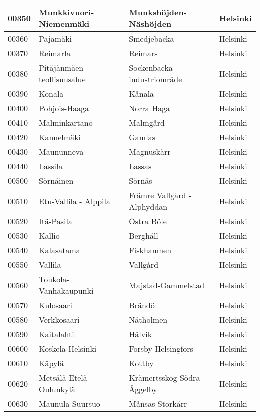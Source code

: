 \begin{longtable}{llll}
    00350 & Munkkivuori-Niemenmäki & Munkshöjden-Näshöjden & Helsinki\\ [0.25ex] \hline
    00360 & Pajamäki & Smedjebacka & Helsinki \\ [0.25ex] \hline
    00370 & Reimarla & Reimars & Helsinki \\ [0.25ex] \hline
    00380 & Pitäjänmäen teollisuusalue & Sockenbacka industriområde & Helsinki \\ [0.25ex] \hline
    00390 & Konala & Kånala & Helsinki \\ [0.25ex] \hline
    00400 & Pohjois-Haaga & Norra Haga & Helsinki \\ [0.25ex] \hline
    00410 & Malminkartano & Malmgård & Helsinki \\ [0.25ex] \hline
    00420 & Kannelmäki & Gamlas & Helsinki \\ [0.25ex] \hline
    00430 & Maununneva & Magnuskärr & Helsinki \\ [0.25ex] \hline
    00440 & Lassila & Lassas & Helsinki \\ [0.25ex] \hline
    00500 & Sörnäinen & Sörnäs & Helsinki \\ [0.25ex] \hline
    00510 & Etu-Vallila - Alppila & Främre Vallgård - Alphyddan & Helsinki \\ [0.25ex] \hline
    00520 & Itä-Pasila & Östra Böle & Helsinki \\ [0.25ex] \hline
    00530 & Kallio & Berghäll & Helsinki \\ [0.25ex] \hline
    00540 & Kalasatama & Fiskhamnen & Helsinki \\ [0.25ex] \hline
    00550 & Vallila & Vallgård & Helsinki \\ [0.25ex] \hline
    00560 & Toukola-Vanhakaupunki & Majstad-Gammelstad & Helsinki \\ [0.25ex] \hline
    00570 & Kulosaari & Brändö & Helsinki \\ [0.25ex] \hline
    00580 & Verkkosaari & Nätholmen & Helsinki \\ [0.25ex] \hline
    00590 & Kaitalahti & Hålvik & Helsinki \\ [0.25ex] \hline
    00600 & Koskela-Helsinki & Forsby-Helsingfors & Helsinki \\ [0.25ex] \hline
    00610 & Käpylä & Kottby & Helsinki \\ [0.25ex] \hline
    00620 & Metsälä-Etelä-Oulunkylä & Krämertsskog-Södra Åggelby & Helsinki \\ [0.25ex] \hline
    00630 & Maunula-Suursuo & Månsas-Storkärr & Helsinki \\ [0.25ex] \hline

\end{longtable}
